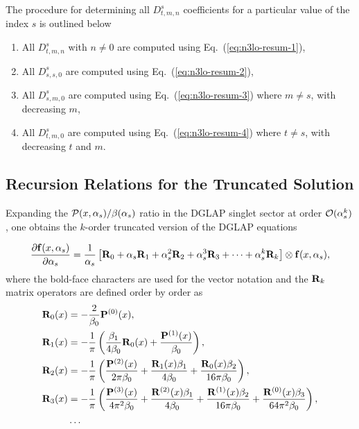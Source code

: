\documentclass[preprint,12pt]{elsarticle}
\begin{document}
The procedure for determining all $D^s_{t,m,n}$ coefficients for a particular value of the index $s$ is outlined below
\begin{enumerate}
\item All $D^s_{t,m,n}$ with $n\neq0$ are computed using Eq.~(\ref{eq:n3lo-resum-1}),
\item All $D^s_{s,s,0}$ are computed using Eq.~(\ref{eq:n3lo-resum-2}),
\item All $D^s_{s,m,0}$ are computed using Eq.~(\ref{eq:n3lo-resum-3}) where $m \neq s$, with decreasing $m$,
\item All $D^s_{t,m,0}$ are computed using Eq.~(\ref{eq:n3lo-resum-4}) where $t \neq s$, with decreasing $t$ and $m$.
\end{enumerate}


\subsection{Recursion Relations for the Truncated Solution}
\label{sec:recrels-singlet}

Expanding the ${\cal P}(x,\alpha_s)/\beta(\alpha_s)$ ratio in the DGLAP singlet sector at order ${\cal O}(\alpha_s^k)$, one obtains the $k$-order truncated version of the DGLAP equations 

\begin{eqnarray}
\frac{\partial{{\bf f}(x,\alpha_s)}}{\partial\alpha_s}=
\frac{1}{\alpha_s}\left[{\bf R}_0+\alpha_s {\bf R}_1 +\alpha_s^2
{\bf R}_2+\alpha_s^3
{\bf R}_3 + \dots + \alpha_s^k {\bf R}_k \right]\otimes {\bf f}(x,\alpha_s),
\label{N3LOsinglet}
\end{eqnarray}
where the bold-face characters are used for the vector notation and the ${\bf R}_k$ matrix operators are defined order by order as
%
\begin{align}
{\bf R}_0(x)&=-\frac{2}{\beta_0}{\bf P}^{(0)}(x),\\
{\bf R}_1(x)&=-\frac{1}{\pi}\left(\frac{\beta_1}{4\beta_0}{\bf R}_0(x) +
\frac{{\bf P}^{(1)}(x)}{\beta_0}\right),
\\
{\bf R}_2(x)&=-\frac{1}{\pi}\left(\frac{{\bf P}^{(2)}(x)}{2\pi\beta_0}
+\frac{{\bf R}_1(x) \beta_1}{4\beta_0}+\frac{{\bf R}_0(x) \beta_2}{16\pi\beta_0}\right), 
\\
{\bf R}_3(x) &= -\frac{1}{\pi}\left(\frac{{\bf P}^{(3)}(x)}{4\pi^2\beta_0} +\frac{{\bf R}^{(2)}(x)\beta_1}{4\beta_0} + \frac{{\bf R}^{(1)}(x)\beta_2}{16\pi\beta_0}+\frac{{\bf R}^{(0)}(x)\beta_3}{64\pi^2\beta_0}\right),\\
&\dots\nonumber
\end{align}
\end{document}

